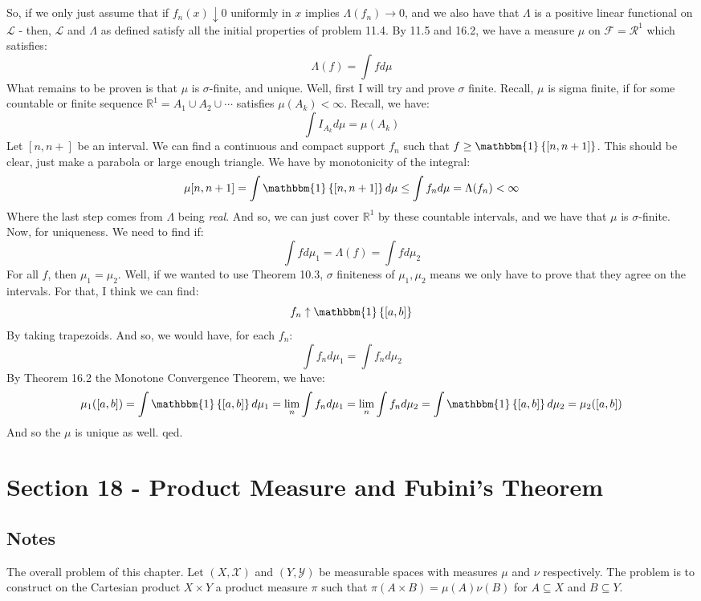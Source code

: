 \documentclass[12pt,a4paper]{article}
\newcommand{\1}[1]{\mathbbm{1}\left\{ #1 \right\}}
\newcommand{\R}{\mathbb{R}}
\newcommand{\lcal}{\mathcal{L}}
\newcommand{\fcal}{\mathcal{F}}
\newcommand{\rcal}{\mathcal{R}}
\newcommand{\xcal}{\mathcal{X}}
\newcommand{\ycal}{\mathcal{Y}}
\begin{document}
\\\\
So, if we only just assume that if $f_n(x) \downarrow 0$ uniformly in $x$ implies $\Lambda(f_n) \to 0$, and we also have that $\Lambda$ is a positive linear functional on $\lcal$ - then, $\lcal$ and $\Lambda$ as defined satisfy all the initial properties of problem 11.4. By 11.5 and 16.2, we have a measure $\mu$ on $\fcal = \rcal^1$ which satisfies:
$$
	\Lambda(f) = \int f d\mu
$$
What remains to be proven is that $\mu$ is $\sigma$-finite, and unique. Well, first I will try and prove $\sigma$ finite. Recall, $\mu$ is sigma finite, if for some countable or finite sequence $\R^1 = A_1 \cup A_2 \cup \cdots$ satisfies $\mu(A_k) < \infty$. Recall, we have:
$$
	\int I_{A_k} d\mu = \mu(A_k)
$$
Let $[n,n+]$ be an interval. We can find a continuous and compact support $f_n$ such that $f \geq \1{[n,n+1]}$. This should be clear, just make a parabola or large enough triangle. We have by monotonicity of the integral:
$$
	\mu[n,n+1] = \int \1{[n,n+1]} d\mu \leq \int f_n d\mu = \Lambda(f_n) < \infty
$$
Where the last step comes from $\Lambda$ being \textit{real}. And so, we can just cover $\R^1$ by these countable intervals, and we have that $\mu$ is $\sigma$-finite. Now, for uniqueness. We need to find if:
$$
	\int f d\mu_1 = \Lambda(f) = \int f d\mu_2
$$
For all $f$, then $\mu_1 = \mu_2$. Well, if we wanted to use Theorem 10.3, $\sigma$ finiteness of $\mu_1, \mu_2$ means we only have to prove that they agree on the intervals. For that, I think we can find:
$$
	f_n \uparrow \1{[a,b]}
$$
By taking trapezoids. And so, we would have, for each $f_n$:
$$
	\int f_n d\mu_1 = \int f_n d\mu_2
$$
By Theorem 16.2 the Monotone Convergence Theorem, we have:
$$
	\mu_1([a,b]) = \int \1{[a,b]} d\mu_1 = \lim_n \int f_n d\mu_1 =
	\lim_n \int f_n d\mu_2 = \int \1{[a,b]} d\mu_2 = \mu_2([a,b])
$$
And so the $\mu$ is unique as well. qed.


\section{Section 18 - Product Measure and Fubini's Theorem}
\subsection{Notes} 
The overall problem of this chapter. Let $(X, \xcal)$ and $(Y, \ycal)$ be measurable spaces with measures $\mu$ and $\nu$ respectively. The problem is to construct on the Cartesian product $X \times Y$ a product measure $\pi$ such that $\pi(A \times B) = \mu(A)\nu(B)$ for $A \subseteq X$ and $B \subseteq Y$.
\end{document}
